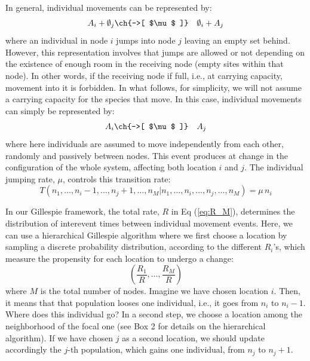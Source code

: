 In general, individual movements can be represented by: 
\begin{eqnarray}
A_i + \emptyset_j & \ch{->[ $\mu$ ]} &  \emptyset_i + A_j \label{Movement}
\end{eqnarray}
where an individual in node $i$ jumps into node $j$ leaving an empty set behind. However, this representation involves that jumps are allowed or not depending on the existence of enough room in the receiving node (empty sites within that node). In other words, if the receiving node if full, i.e., at carrying capacity, movement into it is forbidden. In what follows, for simplicity, we will not assume a carrying capacity for the species that move. In this case, individual movements can simply be represented by: 
\begin{eqnarray}
A_i  & \ch{->[ $\mu$ ]} &   A_j \label{Movement}
\end{eqnarray}
where here individuals are assumed to move independently from each other, randomly and passively between nodes. This event produces at change in the configuration of the whole system, affecting both location $i$ and $j$. The individual jumping rate, $\mu$, controls this transition rate:
\begin{equation} 
\label{Tu}
T(n_1, \dots, n_i-1, \dots, n_j+1, \dots, n_M|n_1, \dots, n_i, \dots, n_j, \dots, n_M )  = \mu \,n_i
\end{equation} 

In our Gillespie framework, the total rate, $R$ in Eq (\ref{eq:R_M}), determines the distribution of interevent times between individual movement events. Here, we can use a hierarchical Gillespie algorithm where we first choose a location by sampling a discrete probability distribution, according to the different $R_i$'s, which measure the propensity for each location to undergo a change:
\begin{equation}
\left(\frac{R_1}{R}, \dots, \frac{R_M}{R}\right)
\end{equation}
where $M$ is the total number of nodes. Imagine we have chosen location $i$. Then, it means that that population looses one individual, i.e., it goes from $n_i$ to $n_i-1$. Where does this individual go? In a second step, we choose a location among the neighborhood of the focal one (see Box 2 for details on the hierarchical algorithm). If we have chosen $j$ as a second location, we should update accordingly the $j$-th population, which gains one individual, from $n_j$ to $n_j+1$. 
\smallskip

